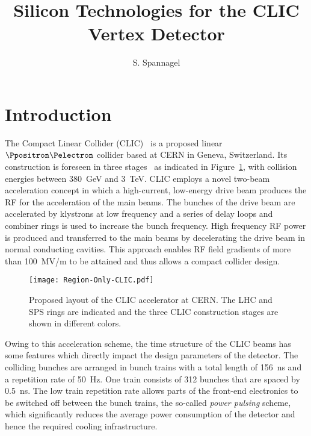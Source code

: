 \documentclass[a4paper,11pt]{article}
\title{Silicon Technologies for the CLIC Vertex Detector}
\author[1]{S. Spannagel\note{Corresponding author.}}
\begin{document}
\maketitle
\flushbottom

\section{Introduction}
\label{sec:intro}

The Compact Linear Collider (CLIC)~\cite{clic} is a proposed linear $\Ppositron\Pelectron$ collider based at CERN in Geneva, Switzerland.
Its construction is foreseen in three stages~\cite{clic-baseline} as indicated in Figure~\ref{fig:clic}, with collision energies between \SI{380}{\GeV} and \SI{3}{\TeV}.
CLIC employs a novel two-beam acceleration concept in which a high-current, low-energy drive beam produces the RF for the acceleration of the main beams.
The bunches of the drive beam are accelerated by klystrons at low frequency and a series of delay loops and combiner rings is used to increase the bunch frequency.
High frequency RF power is produced and transferred to the main beams by decelerating the drive beam in normal conducting cavities.
This approach enables RF field gradients of more than \SI{100}{MV/m} to be attained and thus allows a compact collider design.

\begin{figure}[tbp]
  \center
  \texttt{[image: Region-Only-CLIC.pdf]}
  \caption[Proposed CLIC layout]{Proposed layout of the CLIC accelerator at CERN. The LHC and SPS rings are indicated and the three CLIC construction stages are shown in different colors.}
  \label{fig:clic}
\end{figure}


Owing to this acceleration scheme, the time structure of the CLIC beams has some features which directly impact the design parameters of the detector.
The colliding bunches are arranged in bunch trains with a total length of \SI{156}{\ns} and a repetition rate of \SI{50}{\Hz}.
One train consists of 312 bunches that are spaced by \SI{0.5}{\ns}.
The low train repetition rate allows parts of the front-end electronics to be switched off between the bunch trains, the so-called \emph{power pulsing} scheme, which significantly reduces the average power consumption of the detector and hence the required cooling infrastructure.
\end{document}
